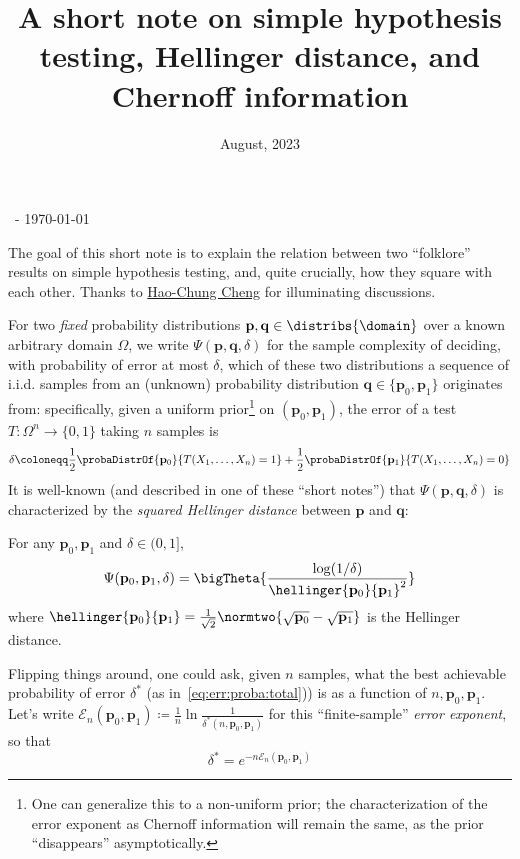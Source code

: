 \documentclass[10pt]{article}
\title{A short note on simple hypothesis testing, Hellinger distance, and Chernoff information}
\date{August, 2023}
\renewcommand{\eqdef}{\coloneqq}
\newcommand{\p}{\mathbf{p}}
\newcommand{\q}{\mathbf{q}}
\newcommand{\errproba}{\delta}
\newcommand{\ns}{n}
\newcommand{\errexp}{\mathcal{E}}
\begin{document}
\begin{flushleft}\sf\footnotesize
\makeatletter
\@date~- \today \hfill \@title
\makeatother
\end{flushleft}
\vspace{5mm}

The goal of this short note is to explain the relation between two ``folklore'' results on simple hypothesis testing, and, quite crucially, how they square with each other. Thanks to \href{https://www.ee.ntu.edu.tw/bio1.php?id=1080917}{Hao-Chung Cheng} for illuminating discussions.\bigskip

For two \emph{fixed} probability distributions $\p,\q\in\distribs{\domain}$ over a known arbitrary domain $\Omega$, we write $\Psi(\p,\q,\errproba)$ for the sample complexity of deciding, with probability of error at most $\errproba$, which of these two distributions a sequence of i.i.d. samples from an (unknown) probability distribution $\q\in\{\p_0,\p_1\}$ originates from: specifically, given a uniform prior\footnote{One can generalize this to a non-uniform prior; the characterization of the error exponent as Chernoff information will remain the same, as the prior ``disappears'' asymptotically.} on $(\p_0,\p_1)$, the error of a test $T\colon \Omega^\ns \to \{0,1\}$ taking $\ns$ samples is
\begin{equation}
	\label{eq:err:proba:total}
	\errproba \eqdef \frac{1}{2}\probaDistrOf{\p_0}{T(X_1,\dots, X_\ns) = 1} + \frac{1}{2}\probaDistrOf{\p_1}{T(X_1,\dots, X_\ns) = 0}
\end{equation}
It is well-known (and described in one of these ``short notes'') that $\Psi(\p,\q,\errproba)$ is characterized by the \emph{squared Hellinger distance} between $\p$ and $\q$:
\begin{fact}
	\label{fact:sample:complexity:sht}
	For any $\p_0,\p_1$ and $\errproba\in(0,1]$, 
	\[
		\Psi(\p_0,\p_1,\errproba) = \bigTheta{\frac{\log(1/\errproba)}{\hellinger{\p_0}{\p_1}^2}}
	\]
	where $\hellinger{\p_0}{\p_1} = \frac{1}{\sqrt{2}} \normtwo{\sqrt{\p_0}-\sqrt{\p_1}}$ is the Hellinger distance.
\end{fact} 
Flipping things around, one could ask, given $\ns$ samples, what the best achievable probability of error $\errproba^\ast$ (as in~\eqref{eq:err:proba:total})) is as a function of $\ns,\p_0,\p_1$. Let's write $\errexp_\ns(\p_0,\p_1) \eqdef \frac{1}{\ns}\ln\frac{1}{\errproba^\ast(\ns,\p_0,\p_1)}$ for this ``finite-sample'' \emph{error exponent}, so that 
\begin{equation}
\errproba^\ast = e^{-\ns \errexp_\ns(\p_0,\p_1)}
\end{equation}
\end{document}
